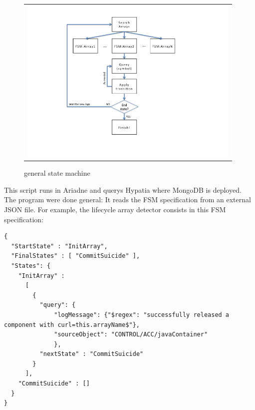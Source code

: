 \documentclass[]{spie}  %
\begin{document}
   \begin{figure}[!ht]
   \begin{center}
   \begin{tabular}{c}
   \includegraphics[height=8.0cm]{../img/FSM-flow-diagram.png}
   \end{tabular}
   \end{center}
   \caption[fsm] 
   { \label{fig:fsm} general state machine}
   \end{figure} 

This script runs in Ariadne and querys Hypatia where MongoDB is deployed. The
program were done general: It reads the FSM specification from an external JSON
file. For example, the lifecycle array detector consists in this FSM
specification:
\begin{verbatim}
{
  "StartState" : "InitArray",
  "FinalStates" : [ "CommitSuicide" ],
  "States": {
    "InitArray" : 
      [
        { 
          "query": {
              "logMessage": {"$regex": "successfully released a component with curl=this.arrayName$"},
              "sourceObject": "CONTROL/ACC/javaContainer"
              },
          "nextState" : "CommitSuicide"
        }
      ],
    "CommitSuicide" : []
  }
}

\end{verbatim}
\end{document}
